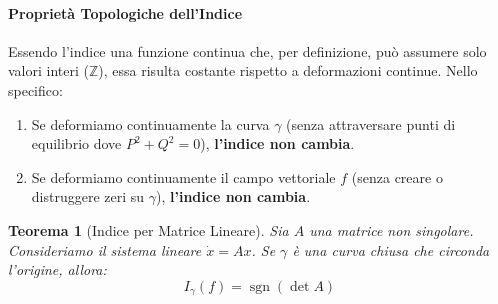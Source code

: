 \documentclass[openany]{book}
\newtheorem*{teorema}{Teorema}
\theoremstyle{definition}
\theoremstyle{remark}
\DeclareMathOperator{\sgn}{sgn}
\newcommand{\Z}{\mathbb{Z}}
\begin{document}
\paragraph{Proprietà Topologiche dell'Indice}
Essendo l'indice una funzione continua che, per definizione, può assumere solo valori interi ($\Z$), essa risulta costante rispetto a deformazioni continue. Nello specifico:
\begin{enumerate}
    \item Se deformiamo continuamente la curva $\gamma$ (senza attraversare punti di equilibrio dove $P^2+Q^2=0$), \textbf{l'indice non cambia}.
    \item Se deformiamo continuamente il campo vettoriale $f$ (senza creare o distruggere zeri su $\gamma$), \textbf{l'indice non cambia}.
\end{enumerate}


\begin{teorema}[Indice per Matrice Lineare]
Sia $A$ una matrice non singolare. Consideriamo il sistema lineare $\dot{x} = Ax$. Se $\gamma$ è una curva chiusa che circonda l'origine, allora:
\[
I_\gamma(f) = \sgn(\det A)
\]
\end{teorema}
\end{document}
